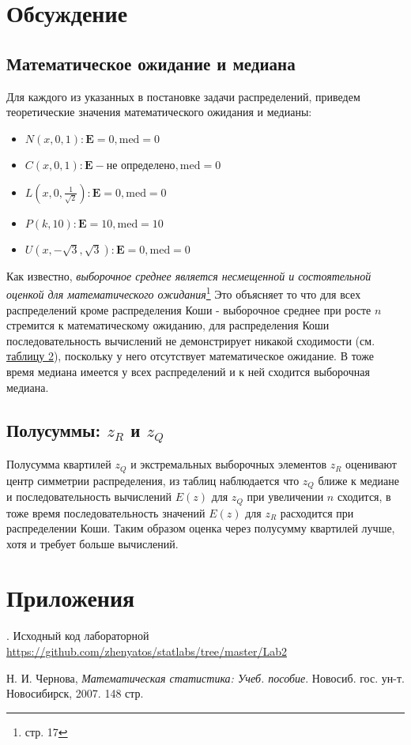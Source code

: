 \documentclass[12pt,a4paper]{article}
\begin{document}
\pagebreak

\section{Обсуждение}
	\subsection{Математическое ожидание и медиана}
	Для каждого из указанных в постановке задачи распределений, приведем теоретические значения математического ожидания и медианы:
	
	\begin{itemize}
		\item $N(x, 0, 1): \mathbf{E}=0, \text{med}=0$ 
		\item $C(x, 0, 1): \mathbf{E} - \text{не определено}, \text{med}=0$
		\item $L(x, 0, \frac{1}{\sqrt{2}}): \mathbf{E}=0, \text{med}=0$
		\item $P(k, 10): \mathbf{E}=10, \text{med}=10$
		\item $U(x, -\sqrt{3}, \sqrt{3}): \mathbf{E}=0, \text{med}=0$
	\end{itemize}
	
	Как известно, \textit{выборочное среднее является несмещенной и состоятельной оценкой для математического ожидания}\footnote{\cite{chernova} стр. 17} Это объясняет то что для всех распределений кроме распределения Коши - выборочное среднее при росте $n$ стремится к математическому ожиданию, для распределения Коши последовательность вычислений не демонстрирует никакой сходимости (см. \hyperref[tab:cauchy]{таблицу 2}), поскольку у него отсутствует математическое ожидание. В тоже время медиана имеется у всех распределений и к ней сходится выборочная медиана.
	
	\subsection{Полусуммы: $z_R$ и $z_Q$}
	Полусумма квартилей $z_Q$ и экстремальных выборочных элементов $z_R$ оценивают центр симметрии распределения, из таблиц наблюдается что $z_Q$ ближе к медиане и последовательность вычислений $E(z) \text{ для } z_Q$ при увеличении $n$ сходится, в тоже время последовательность значений $E(z) \text{ для } z_R$ расходится при распределении Коши. Таким образом оценка через полусумму квартилей лучше, хотя и требует больше вычислений.
\pagebreak

\section{Приложения}
. Исходный код лабораторной {\url{https://github.com/zhenyatos/statlabs/tree/master/Lab2}}

\begin{thebibliography}{9} 
	 Н. И. Чернова, \emph{Математическая статистика: Учеб. пособие}. Новосиб. гос. ун-т. Новосибирск, 2007. 148 стр.
\end{thebibliography}
\end{document}
